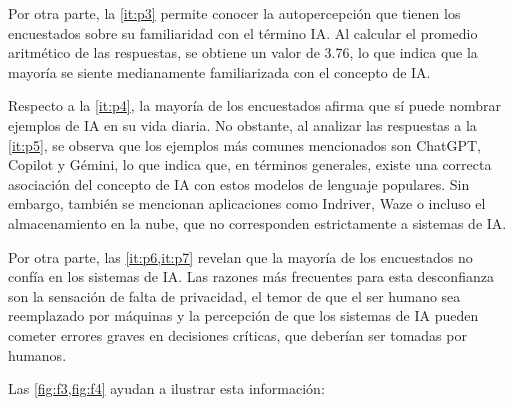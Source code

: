 \documentclass[12pt,a4paper]{article}
\begin{document}
Por otra parte, la \cref{it:p3} permite conocer la autopercepción que tienen los encuestados sobre su 
familiaridad con el término IA. Al calcular el promedio aritmético de las respuestas, 
se obtiene un valor de 3.76, lo que indica que la mayoría se siente medianamente familiarizada 
con el concepto de IA. 

Respecto a la \cref{it:p4}, la mayoría de los encuestados afirma que sí puede nombrar ejemplos de IA en 
su vida diaria. No obstante, al analizar las respuestas a la \cref{it:p5}, se observa que los ejemplos más 
comunes mencionados son ChatGPT, Copilot y Gémini, lo que indica que, en términos generales, existe una correcta asociación 
del concepto de IA con estos modelos de lenguaje populares. Sin embargo, también se mencionan aplicaciones como Indriver, 
Waze o incluso el almacenamiento en la nube, que no corresponden estrictamente a sistemas de IA. 

Por otra parte, las \cref{it:p6,it:p7} revelan que la mayoría de los encuestados no confía en los sistemas de IA. 
Las razones más frecuentes para esta desconfianza son la sensación de falta de privacidad, 
el temor de que el ser humano sea reemplazado por máquinas y la percepción de que los sistemas de IA pueden cometer errores graves en decisiones críticas, 
que deberían ser tomadas por humanos. 

Las \cref{fig:f3,fig:f4} ayudan a ilustrar esta información:
\end{document}
